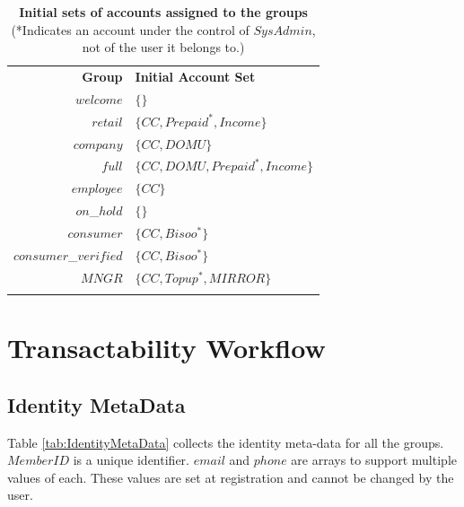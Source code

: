 \begin{table}[h]
\vspace{-0.5cm}
\begin{centering}
\small
{
\begin{tabular}{ r | l  }
\hline
\textbf{Group}	& {\bf Initial Account Set} \\
\Xhline{1.5pt}
$welcome$	& $\{ \}$ \\
\hline
$retail$		& $\{ CC, Prepaid^*, Income \}$ \\
\hline
$company$	& $\{ CC, DOMU \}$ \\
\hline
$full$		& $\{ CC, DOMU, Prepaid^*, Income \}$ \\
\hline
$employee$	& $\{ CC \}$ \\
\hline
$on$\_$hold$	& $\{  \}$ \\
\hline
$consumer$	& $\{ CC, Bisoo^* \}$ \\
\hline
$consumer$\_$verified$ & $\{ CC, Bisoo^* \}$ \\
\hline
$MNGR$ 		& $\{ CC, Topup^*, MIRROR \}$ \\
\Xhline{1.5pt}
\end{tabular}
}
\caption{\small\textbf{Initial sets of accounts assigned to the groups}\\ (*Indicates an account under the control of $SysAdmin$, not of the user it belongs to.)}
\label{tab:InitialAccountSets}
\end{centering}
\vspace{-1cm}
\end{table}

\section{Transactability Workflow}
\subsection{Identity MetaData}
Table \ref{tab:IdentityMetaData} collects the identity meta-data for all the groups. $MemberID$ is a unique identifier. $email$ and $phone$ are arrays to support multiple values of each. These values are set at registration and cannot be changed by the user.

